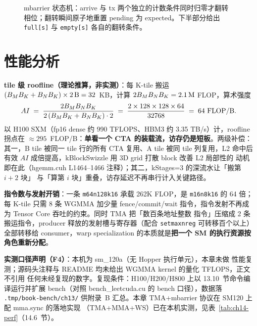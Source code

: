 \begin{figure}[htbp]
\caption{mbarrier 状态机：arrive 与 tx 两个独立的计数条件同时归零才翻转相位；翻转瞬间原子地重置 pending 为 expected。下半部分给出 \texttt{full[s]} 与 \texttt{empty[s]} 各自的翻转条件。}
\label{fig:13-3}
\end{figure}

\section{性能分析}

\textbf{tile 级 roofline（理论推算，非实测）}：每 K-tile 搬运
$(B\sb{M} B\sb{K} + B\sb{N} B\sb{K}) \times 2\,\mathrm{B} = 32$~KB，计算
$2 B\sb{M} B\sb{N} B\sb{K} = 2.1\,\mathrm{M}$ FLOP，算术强度
\begin{equation}
  AI \;=\; \frac{2 B\sb{M} B\sb{N} B\sb{K}}
  {2\,(B\sb{M} B\sb{K} + B\sb{N} B\sb{K}) \cdot 2}
  \;=\; \frac{2 \times 128 \times 128 \times 64}{32768}
  \;=\; 64 \ \mathrm{FLOP/B} .
\end{equation}
以 H100 SXM（fp16 dense 约 990 TFLOPS、HBM3 约 3.35 TB/s）计，roofline 拐点在
$\approx 295$~FLOP/B：\textbf{单看一个 CTA 的装载流，访存仍是短板}。两级补偿：
其一，B tile 被同一 tile 行的所有 CTA 复用、A tile 被同 tile 列复用，L2 命中后
有效 $AI$ 成倍提高，kBlockSwizzle 用 3D grid 打散 block 改善 L2 局部性的
动机即在此（hgemm.cuh L1464--1466 注释）；其二，kStages=3 的深流水让「搬第 $i{+}2$ 块」
与「算第 $i$ 块」重叠，访存延迟不再串行计入关键路径。

\textbf{指令数与发射开销}：一条 \texttt{m64n128k16} 承载 262K FLOP，是
\texttt{m16n8k16} 的 64 倍；每 K-tile 只需 8 条 WGMMA 加少量 fence/commit/wait
指令，指令发射不再成为 Tensor Core 吞吐的约束。同时 TMA 把「数百条地址整数
指令」压缩成 2 条搬运指令，producer 释放的发射槽与寄存器（配合
\texttt{setmaxnreg} 可转移百个以上）全部转移给 consumer，warp specialization
的本质就是\textbf{把一个 SM 的执行资源按角色重新分配}。

\textbf{实测口径声明（F4）}：本机为 sm\_120a（无 Hopper 执行单元），本章未做
性能复测；源码头注释与 README 均未给出 WGMMA kernel 的量化 TFLOPS，正文不引用
任何未经复现的数字。复现条件：H100/H200/H800 上以 13.10~节命令编译运行并扩展
bench（对照 bench\_leetcuda.cu 的 bench 口径），数据落 \texttt{.\allowbreak{}tmp/\allowbreak{}book-bench/\allowbreak{}ch13/\allowbreak{}}
供附录~B 汇总。本章 TMA+mbarrier 协议在 SM120 上配 mma.sync 的落地实现
（TMA+MMA+WS）已在本机实测，见表~\ref{tab:ch14-perf}（14.6~节）。

